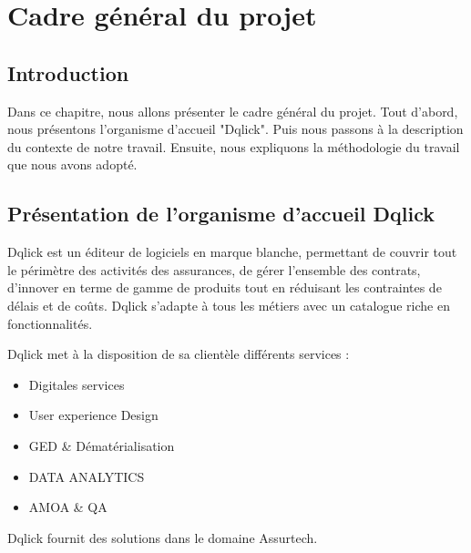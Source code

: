 \chapter{Cadre général du projet}
\section*{Introduction}
Dans ce chapitre, nous allons présenter le cadre général du projet. Tout d'abord, nous présentons l'organisme d'accueil "Dqlick". Puis nous passons à la description du contexte de notre travail. Ensuite, nous expliquons la méthodologie du travail que nous avons adopté.


\section {Présentation de l’organisme d’accueil Dqlick}

Dqlick est un éditeur de logiciels en marque blanche, permettant de couvrir tout le périmètre des activités des assurances, de gérer l’ensemble des contrats, d’innover en terme de gamme de produits tout en réduisant les contraintes de délais et de coûts. Dqlick s'adapte à tous les métiers avec un catalogue riche en fonctionnalités.
 


\item Dqlick met à la disposition de sa clientèle différents services :

\begin{itemize}[font=\normalsize]

\item Digitales  services 

\item User experience Design 

\item GED & Dématérialisation 

\item DATA ANALYTICS

\item AMOA & QA

\end{itemize}

\item Dqlick fournit des solutions dans le domaine Assurtech.

